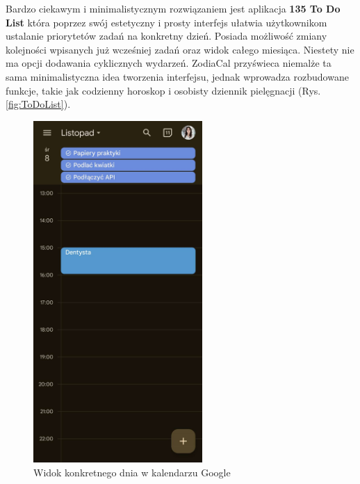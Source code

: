 Bardzo ciekawym i minimalistycznym rozwiązaniem jest aplikacja \textbf{135 To Do List} która poprzez swój estetyczny
i prosty interfejs ułatwia użytkownikom ustalanie priorytetów zadań na konkretny dzień.
Posiada możliwość zmiany kolejności wpisanych już wcześniej zadań oraz widok całego miesiąca.
Niestety nie ma opcji dodawania cyklicznych wydarzeń. ZodiaCal przyświeca niemalże ta sama minimalistyczna
idea tworzenia interfejsu, jednak wprowadza rozbudowane funkcje, takie jak codzienny horoskop i osobisty dziennik pielęgnacji (Rys. \ref{fig:ToDoList}).

\begin{figure}[t]
	\begin{minipage}{0.4\textwidth}
		\centering
		\includegraphics[height=13cm, keepaspectratio]{images/analiza/googleCalendar}
		\caption{Widok konkretnego dnia w kalendarzu Google}
		\label{fig:googleCalendar}
	\end{minipage}
	\hfill
	\begin{minipage}{0.4\textwidth}
		\centering

\end{minipage}
\end{figure}
